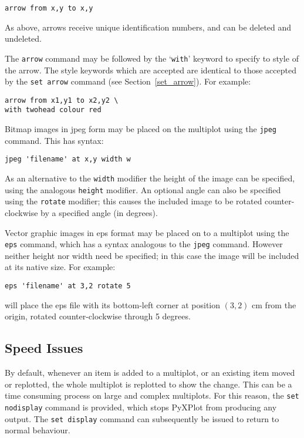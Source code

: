 \documentclass[a4paper,onecolumn,11pt]{book}
\begin{document}
\begin{verbatim} 
arrow from x,y to x,y
\end{verbatim}

As above, arrows receive unique identification numbers, and can be deleted and
undeleted.

The \texttt{arrow} command may be followed by the `\texttt{with}' keyword to
specify to style of the arrow. The style keywords which are accepted are
identical to those accepted by the \texttt{set arrow} command (see
Section~\ref{set_arrow}). For example:

\begin{verbatim} 
arrow from x1,y1 to x2,y2 \
with twohead colour red
\end{verbatim}

 Bitmap images in jpeg form may be
placed on the multiplot using the {\tt jpeg} command.  This has syntax:

\begin{verbatim}
jpeg 'filename' at x,y width w
\end{verbatim}

As an alternative to the {\tt width} modifier the height of the image can be
specified, using the analogous {\tt height} modifier.  An optional angle can
also be specified using the {\tt rotate} modifier; this causes the included
image to be rotated counter-clockwise by a specified angle (in degrees).

 Vector graphic images in eps format may
be placed on to a multiplot using the {\tt eps} command, which has a syntax
analogous to the {\tt jpeg} command.  However neither height nor width need be
specified; in this case the image will be included at its native size.  For
example:

\begin{verbatim}
eps 'filename' at 3,2 rotate 5
\end{verbatim}

\noindent will place the eps file with its bottom-left corner at position
$(3,2)$ cm from the origin, rotated counter-clockwise through 5 degrees.

\subsection{Speed Issues}
\label{set_display}

By default, whenever an item is added to a multiplot, or an existing item moved
or replotted, the whole multiplot is replotted to show the change. This can be
a time consuming process on large and complex multiplots. For this reason, the
\texttt{set nodisplay}\index{set display command@\texttt{set display} command}
command is provided, which stops PyXPlot from producing any output. The
\texttt{set display} command can subsequently be issued to return to normal
behaviour.
\end{document}
